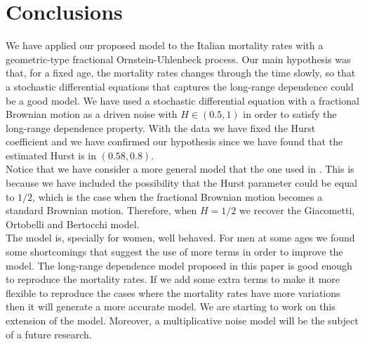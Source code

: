 \documentclass[smallextended]{svjour3}
\begin{document}
\section{Conclusions}


We have applied our proposed model to the Italian mortality rates with a 
geometric-type fractional Ornstein-Uhlenbeck process. Our
main hypothesis was that, for a fixed age, the mortality rates changes through 
the time slowly, so that a stochastic differential equations
that captures the long-range dependence could be a good model. We have used a 
stochastic differential equation with a fractional Brownian motion as a driven 
noise with $H\in (0.5,1)$ in order to satisfy the long-range dependence 
property. With the data we have fixed the Hurst coefficient and we have 
confirmed our hypothesis since
we have found that the estimated Hurst is in $(0.58,0.8)$.  \\



Notice that we have consider a more general model that the one used in 
\cite{gi-or-be}. This is because we have included the possibility that the
Hurst parameter could be equal to $1/2$, which is the case when the fractional 
Brownian motion becomes a standard Brownian motion. Therefore,
when $H=1/2$ we recover the  Giacometti, Ortobelli and Bertocchi model.\\





The model is, specially for women, well behaved. For men at some ages we found 
some shortcomings that suggest the use of more terms in order to improve
the model. The long-range dependence model proposed in this paper is good 
enough to reproduce the mortality rates. If we add some extra terms to make it 
more flexible to reproduce the cases where the mortality rates have more 
variations then it will generate a more accurate model. We are starting to work 
on this extension of the model. Moreover, a multiplicative noise model will be 
the subject of a future research.\\
\end{document}
